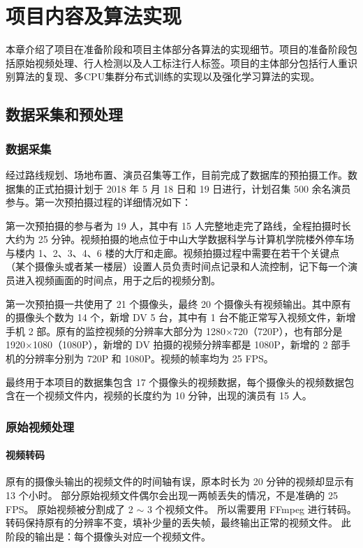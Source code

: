 \chapter{项目内容及算法实现}\label{sec:algorithm}

本章介绍了项目在准备阶段和项目主体部分各算法的实现细节。项目的准备阶段包括原始视频处理、行人检测以及人工标注行人标签。项目的主体部分包括行人重识别算法的复现、多CPU集群分布式训练的实现以及强化学习算法的实现。

\section{数据采集和预处理}

\subsection{数据采集}

经过路线规划、场地布置、演员召集等工作，目前完成了数据库的预拍摄工作。数据集的正式拍摄计划于 2018 年 5 月 18 日和 19 日进行，计划召集 500 余名演员参与。第一次预拍摄过程的详细情况如下：

第一次预拍摄的参与者为 19 人，其中有 15 人完整地走完了路线，全程拍摄时长大约为 25 分钟。视频拍摄的地点位于中山大学数据科学与计算机学院楼外停车场与楼内 1、2、3、4、6 楼的大厅和走廊。视频拍摄过程中需要在若干个关键点（某个摄像头或者某一楼层）设置人员负责时间点记录和人流控制，记下每一个演员进入视频画面的时间点，用于之后的视频分割。

第一次预拍摄一共使用了 21 个摄像头，最终 20 个摄像头有视频输出。其中原有的摄像头个数为 14 个，新增 DV 5 台，其中有 1 台不能正常写入视频文件，新增手机 2 部。原有的监控视频的分辨率大部分为 1280$\times$720（720P），也有部分是 1920$\times$1080（1080P），新增的 DV 拍摄的视频分辨率都是 1080P，新增的 2 部手机的分辨率分别为 720P 和 1080P。视频的帧率均为 25 FPS。

最终用于本项目的数据集包含 17 个摄像头的视频数据，每个摄像头的视频数据包含在一个视频文件内，视频的长度约为 10 分钟，出现的演员有 15 人。

\subsection{原始视频处理}

\subsubsection{视频转码}
原有的摄像头输出的视频文件的时间轴有误，原本时长为 20 分钟的视频却显示有 13 个小时。
部分原始视频文件偶尔会出现一两帧丢失的情况，不是准确的 25 FPS。
原始视频被分割成了 2 $\sim$ 3 个视频文件。
所以需要用 FFmpeg 进行转码。转码保持原有的分辨率不变，填补少量的丢失帧，最终输出正常的视频文件。
此阶段的输出是：每个摄像头对应一个视频文件。

